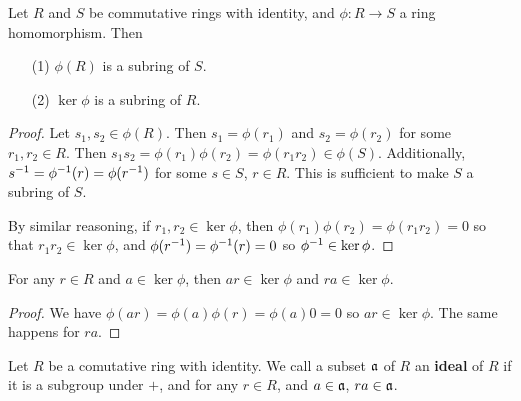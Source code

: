 \begin{lemma}\label{1.3.1}
    Let $R$ and $S$ be commutative rings with identity, and $\phi:R \xrightarrow{}
    S$ a ring homomorphism. Then
    \begin{enumerate}
        \item[(1)] $\phi(R)$ is a subring of $S$.

        \item[(2)] $\ker{\phi}$ is a subring of $R$.
    \end{enumerate}
\end{lemma}
\begin{proof}
    Let $s_1,s_2 \in \phi(R)$. Then $s_1=\phi(r_1)$ and $s_2=\phi(r_2)$ for some
    $r_1,r_2 \in R$. Then $s_1s_2=\phi(r_1)\phi(r_2)=\phi(r_1r_2) \in \phi(S)$.
    Additionally, $s^{-1}=\phi^{-1}(r)=\phi(r^{-1})$ for some $s \in S$,  $r
    \in R$. This is sufficient to make  $S$ a subring of  $S$.

    By similar reasoning, if $r_1,r_2 \in \ker{\phi}$, then
    $\phi(r_1)\phi(r_2)=\phi(r_1r_2)=0$ so that $r_1r_2 \in \ker{\phi}$, and
    $\phi(r^{-1})=\phi^{-1}(r)=0$ so $\phi^{-1}\in \ker{\phi}$.
\end{proof}
\begin{corollary}
    For any $r \in R$ and  $a \in \ker{\phi}$, then $ar \in \ker{\phi}$ and $ra
    \in \ker{\phi}$.
\end{corollary}
\begin{proof}
    We have $\phi(ar)=\phi(a)\phi(r)=\phi(a)0=0$ so $ar \in \ker{\phi}$. The
    same happens for $ra$.
\end{proof}

\begin{definition}
    Let $R$ be a comutative ring with identity. We call a subset $\mathfrak{a}$ of $R$ an
    \textbf{ideal} of $R$ if it is a subgroup under $+$, and for any $r \in R$,
    and  $a \in \mathfrak{a}$,  $ra \in \mathfrak{a}$.
\end{definition}

